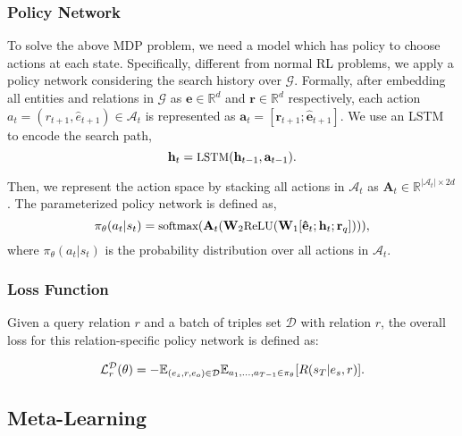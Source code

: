 \documentclass[11pt,a4paper]{article}
\begin{document}
\subsubsection{Policy Network}

To solve the above MDP problem, we need a model which has policy to choose actions at each state. Specifically, different from normal RL problems, we apply a policy network considering the search history over $\mathcal{G}$. Formally, after embedding all entities and relations in $\mathcal{G}$ as $\mathbf{e} \in \mathbb{R}^{d}$ and $\mathbf{r} \in \mathbb{R}^{d}$ respectively, each action $a_t = (r_{t+1}, \hat{e}_{t+1}) \in \mathcal{A}_t$ is represented as $\mathbf{a}_t = [\mathbf{r}_{t+1}; \mathbf{\hat{e}}_{t+1}]$. We use an LSTM to encode the search path,
\begin{equation}
\small
    \mathbf{h}_t = \text{LSTM} (\mathbf{h}_{t - 1}, \mathbf{a}_{t - 1}).
\end{equation}

Then, we represent the action space by stacking all actions in $\mathcal{A}_t$ as $\mathbf{A}_t \in \mathbb{R}^{|\mathcal{A}_t| \times 2d}$. The parameterized policy network is defined as,
\begin{equation}
  \small
  \pi_{\theta}(a_t|s_t) = \text{softmax} (\mathbf{A}_t (\mathbf{W}_2 \text{ReLU} (\mathbf{W}_1[\mathbf{\hat{e}}_t;\mathbf{h}_t;\mathbf{r}_q]))),
\end{equation}
where $\pi_{\theta}(a_t|s_t)$ is the probability distribution over all actions in $\mathcal{A}_t$.

\subsubsection{Loss Function}

Given a query relation $r$ and a batch of triples set $\mathcal{D}$ with relation $r$, the overall loss for this relation-specific policy network is defined as:

\begin{equation}
\label{loss_func}
\small
    \mathcal{L}_r^{\mathcal{D}}(\theta) = -\mathbb{E}_{(e_s, r, e_o) \in \mathcal{D} } \mathbb{E}_{a_1, \dots, a_{T-1} \in \pi_{\theta} } [R(s_T|e_s, r)].
\end{equation}





\subsection{Meta-Learning}
\end{document}
